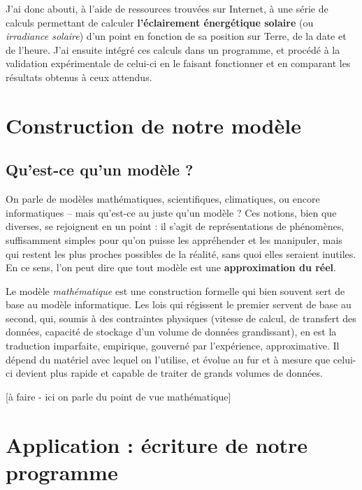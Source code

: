 \documentclass[12pt]{article}
\begin{document}
J'ai donc abouti, à l'aide de ressources trouvées sur Internet, à une série de calculs permettant de calculer \textbf{l'éclairement énergétique solaire} (ou \textit{irradiance solaire}) d'un point en fonction de sa position sur Terre, de la date et de l'heure.
J'ai ensuite intégré ces calculs dans un programme, et procédé à la validation expérimentale de celui-ci en le faisant fonctionner et en comparant les résultats obtenus à ceux attendus.

\clearpage
\section{Construction de notre modèle}

\subsection{Qu'est-ce qu'un modèle ?}

On parle de modèles mathématiques, scientifiques, climatiques, ou encore informatiques -- mais qu'est-ce au juste qu'un modèle ?
Ces notions, bien que diverses, se rejoignent en un point : il s'agit de représentations de phénomènes, suffisamment simples pour qu'on puisse les appréhender et les manipuler, mais qui restent les plus proches possibles de la réalité, sans quoi elles seraient inutiles.
En ce sens, l'on peut dire que tout modèle est une \textbf{approximation du réel}.

Le modèle \textit{mathématique} est une construction formelle qui bien souvent sert de base au modèle informatique. Les lois qui régissent le premier servent de base au second, qui, soumis à des contraintes physiques (vitesse de calcul, de transfert des données, capacité de stockage d'un volume de données grandissant), en est la traduction imparfaite, empirique, gouverné par l'expérience, approximative. Il dépend du matériel avec lequel on l'utilise, et évolue au fur et à mesure que celui-ci devient plus rapide et capable de traiter de grands volumes de données.



[à faire - ici on parle du point de vue mathématique]


\clearpage
\section{Application : écriture de notre programme}
\end{document}
